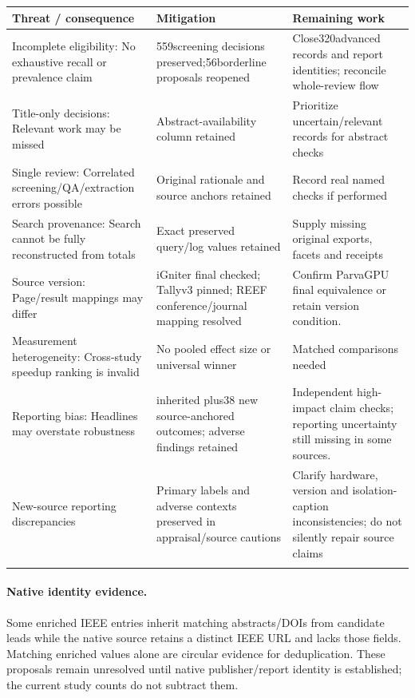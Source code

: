 \begin{longtable}{>{\raggedright\arraybackslash}p{}>{\raggedright\arraybackslash}p{}>{\raggedright\arraybackslash}p{}}
\toprule
\textbf{Threat / consequence} & \textbf{Mitigation} & \textbf{Remaining work}\\\midrule\endhead
Incomplete eligibility: No exhaustive recall or prevalence claim & 559screening decisions preserved;56borderline proposals reopened & Close320advanced records and report identities; reconcile whole-review flow\\\addlinespace
Title-only decisions: Relevant work may be missed & Abstract-availability column retained & Prioritize uncertain/relevant records for abstract checks\\\addlinespace
Single review: Correlated screening/QA/extraction errors possible & Original rationale and source anchors retained & Record real named checks if performed\\\addlinespace
Search provenance: Search cannot be fully reconstructed from totals & Exact preserved query/log values retained & Supply missing original exports, facets and receipts\\\addlinespace
Source version: Page/result mappings may differ & iGniter final checked; Tallyv3 pinned; REEF conference/journal mapping resolved & Confirm ParvaGPU final equivalence or retain version condition.\\\addlinespace
Measurement heterogeneity: Cross-study speedup ranking is invalid & No pooled effect size or universal winner & Matched comparisons needed\\\addlinespace
Reporting bias: Headlines may overstate robustness & 52 inherited plus38 new source-anchored outcomes; adverse findings retained & Independent high-impact claim checks; reporting uncertainty still missing in some sources.\\\addlinespace
New-source reporting discrepancies & Primary labels and adverse contexts preserved in appraisal/source cautions & Clarify hardware, version and isolation-caption inconsistencies; do not silently repair source claims\\\addlinespace
\bottomrule\end{longtable}\paragraph{Native identity evidence.} Some enriched IEEE entries inherit matching abstracts/DOIs from candidate leads while the native source retains a distinct IEEE URL and lacks those fields. Matching enriched values alone are circular evidence for deduplication. These proposals remain unresolved until native publisher/report identity is established; the current study counts do not subtract them.
